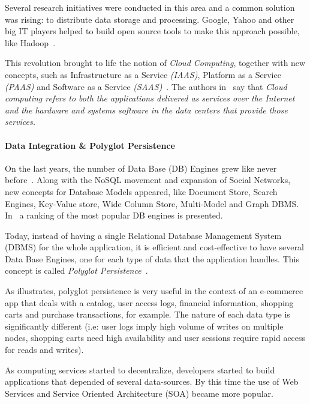\documentclass{article}
\begin{document}
Several research initiatives were conducted in this area and a common solution was rising: to distribute data storage and processing. 
Google, Yahoo and other big IT players helped to build open source tools to make this approach possible, like Hadoop~\cite{5496972}.

This revolution brought to life the notion of \textit{Cloud Computing}, together with new concepts, such as Infrastructure as a Service \textit{(IAAS)}, Platform as a Service \textit{(PAAS)} and Software as a Service \textit{(SAAS)}~\cite{AViewOfCloudComputing}.
The authors in~\cite{AViewOfCloudComputing} say that \textit{Cloud computing refers to both the applications delivered as services over the Internet and the hardware and systems software in the data centers that provide those services.} 


\paragraph*{Data Integration \& Polyglot Persistence}
On the last years, the number of Data Base (DB) Engines grew like never before~\cite{dbranking}. 
Along with the NoSQL movement and expansion of Social Networks, new concepts for Database Models appeared, like Document Store, Search Engines, Key-Value store, Wide Column Store, Multi-Model and Graph DBMS. 
In~\cite{dbranking} a ranking of the most popular DB engines is presented.

Today, instead of having a single Relational Database Management System (DBMS) for the whole application, it is efficient and cost-effective to have several Data Base Engines, one for each type of data that the application handles. 
This concept is called \textit{Polyglot Persistence}~\cite{sadalage2012nosql}.


As \cite{AdressingDataManagementCloud} illustrates, polyglot persistence is very useful in the context of an e-commerce app that deals with a catalog, user access logs, financial information, shopping carts and purchase transactions, for example.
The nature of each data type is significantly different (i.e: user logs imply high volume of writes on multiple nodes, shopping carts need high availability and user sessions require rapid access for reads and writes). 

As computing services started to decentralize, developers started to build applications that depended of several data-sources. By this time the use of Web Services and Service Oriented Architecture (SOA) became more popular. \cite{Armbrust09m.:above}
\end{document}
